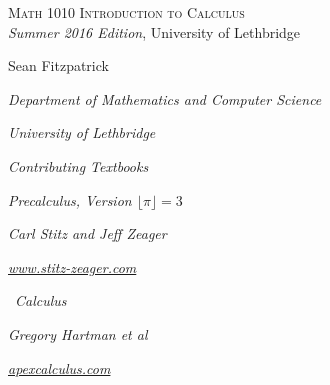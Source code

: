 
\hskip 125pt\begin{minipage}{\textwidth}
\begin{flushright}

\textsc{{\Huge Math 1010 Introduction to Calculus}} \\

\textsl{Summer 2016 Edition}, 
{\Large University of Lethbridge}\\


\bigskip

\Large
\vspace{1in}

Sean Fitzpatrick

\emph{\large Department of Mathematics and Computer Science}

\emph{\large University of Lethbridge}\vskip15pt

\parbox{200pt}{\textit{Contributing Textbooks}}\hskip 2cm \phantom{.}

\vspace{0.5in}

\textit{Precalculus, Version $\lfloor \pi\rfloor = 3$}

\emph{\large Carl Stitz and Jeff Zeager}

\emph{\large \href{http://www.stitz-zeager.com}{www.stitz-zeager.com}}\vskip 15pt

\apex\ \textit{Calculus}

\emph{\large Gregory Hartman et al}

\emph{\large \href{http://www.apexcalculus.com}{apexcalculus.com}}\vskip 15pt


\normalsize
\end{flushright}
\end{minipage}

